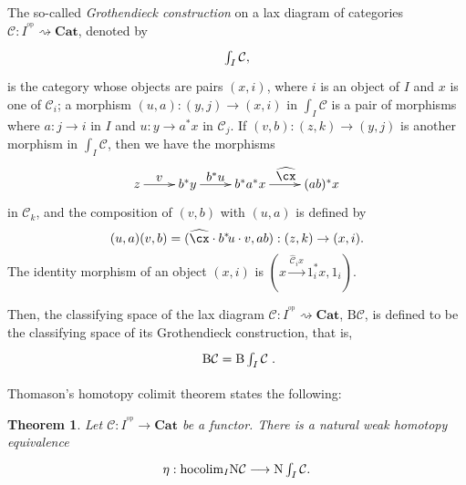\documentclass[]{amsart}
\newtheorem{theorem}{Theorem}[section]
\begin{document}
 The so-called {\em Grothendieck
construction} on a lax diagram of categories ${{\ensuremath{\mathcal{C}}}:I^{^{\mathrm{op}}} \rightsquigarrow{\ensuremath{\mathbf{Cat}}}}$,
denoted by $$ \xymatrix{\int_I{\ensuremath{\mathcal{C}}},} $$ is the category whose objects are pairs $(x,i)$, where $i$ is
an object of $I$ and $x$ is one of ${\mathcal C}_i$; a morphism $(u,a):(y,j)\to (x,i)$ in
$\int_I{\ensuremath{\mathcal{C}}}$ is a pair of morphisms where $a:j\to i$ in $I$ and $u:y\to a^*x$ in ${\ensuremath{\mathcal{C}}}_j$. If
$(v,b):(z,k)\to (y,j)$ is another morphism in $\int_I{\ensuremath{\mathcal{C}}}$, then we have the morphisms
$$\xymatrix{z\ar[r]^-{\textstyle v}& b^*y\ar[r]^-{\textstyle b^*u}&
b^*a^*x\ar[r]^{\textstyle \widehat\cx}&(ab)^*x}$$ in ${\ensuremath{\mathcal{C}}}_k$, and the composition of $(v,b)$ with
$(u,a)$ is defined by
$$ (u,a)(v,b) =(\widehat\cx\cdot  b^*\!u\cdot  v, ab):(z,k)\to (x,i).$$
The identity morphism of an object $(x,i)$ is $(x\overset{\textstyle
\widehat{\ensuremath{\mathcal{C}}}_ix}\longrightarrow 1_i^*x,1_i)$.

Then, the classifying space of the lax diagram ${\ensuremath{\mathcal{C}}}:I^{{^\mathrm{op}}} \rightsquigarrow{\ensuremath{\mathbf{Cat}}}$,
${\ensuremath{\mathrm{B}}} {\ensuremath{\mathcal{C}}}$,  is defined to be the classifying space of its Grothendieck construction, that is,
\begin{equation}\label{p.1.15}\xymatrix{{\ensuremath{\mathrm{B}}}{\ensuremath{\mathcal{C}}}={\ensuremath{\mathrm{B}}} \int_I{\ensuremath{\mathcal{C}}}}.\end{equation}

 Thomason's homotopy colimit theorem \cite[Theorem 1.2]{thomason}
states the following:

\begin{theorem}\label{thoma} Let ${\ensuremath{\mathcal{C}}}:I^{{^\mathrm{op}}} \to {\ensuremath{\mathbf{Cat}}}$ be a functor. There is a natural weak homotopy equivalence
\begin{equation}\label{p.1.18}\xymatrix{ \eta:{\ensuremath{\mathrm{hocolim}}}_I{\ensuremath{\mathrm{N}}}{\ensuremath{\mathcal{C}}} \longrightarrow {\ensuremath{\mathrm{N}}}\int_I{\ensuremath{\mathcal{C}}}.} \end{equation}
\end{theorem}
\end{document}
